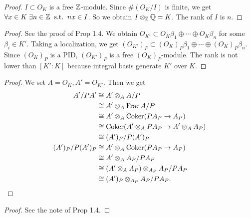 \begin{proof}
  $I \subset O_K$ is a free ${\mathbb Z}$-module. Since $\# (O_K/I)$ is finite, we get $\forall x \in K \; \exists n \in {\mathbb Z} \; \; \text{s.t.} \; \; nx \in I$. So we obtain $I \otimes_{{\mathbb Z}} {\mathbb Q} = K$. The rank of $I$ is $n$.
\end{proof}

\begin{proof}
See the proof of Prop 1.4. We obtain $O_{K'} \subset O_K \beta_1 \oplus \cdots \oplus  O_K \beta_n$ for some $\beta_i \in K'$. Taking a localization, we get $(O_{K'})_P \subset (O_K)_P \beta_1 \oplus \cdots \oplus  (O_K)_P \beta_n$. Since $(O_K)_P$ is a PID, $(O_{K'})_P$ is a free $(O_K)_P$-module. The rank is not lower than $[K':K]$ because integral basis generate $K'$ over $K$.
\end{proof}


\begin{proof}
  We set $A = O_K, A'=O_{K'}$. Then we get
  \begin{align*}
    A'/PA' &\cong A' \otimes_A A/P \\
    &\cong A' \otimes_A \operatorname{Frac} A/P \\
    &\cong A' \otimes_A \operatorname{Coker} (PA_P \to A_P) \\
    &\cong \operatorname{Coker} (A' \otimes_A PA_P \to A' \otimes_A A_P) \\
    &\cong (A')_P / P(A')_P \\
    (A')_P / P(A')_P  &\cong A' \otimes_A \operatorname{Coker} (PA_P \to A_P) \\
    &\cong A' \otimes_A A_P / PA_P \\
    &\cong (A' \otimes_A  A_P) \otimes_{A_P} A_P / PA_P \\
    &\cong (A')_P \otimes_{A_P} A_P / PA_P.
  \end{align*}
\end{proof}



\begin{proof}
  See the note of Prop 1.4.
\end{proof}



